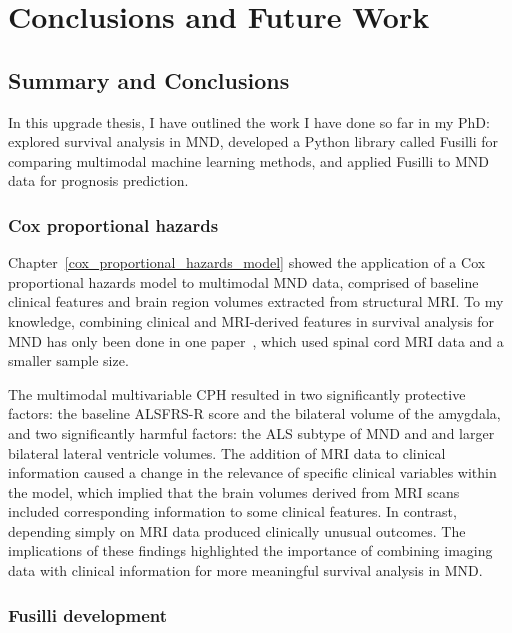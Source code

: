 \chapter{Conclusions and Future Work}
\label{conclusions_and_future_work}

\section{Summary and Conclusions}

In this upgrade thesis, I have outlined the work I have done so far in my PhD: explored survival analysis in MND, developed a Python library called Fusilli for comparing multimodal machine learning methods, and applied Fusilli to MND data for prognosis prediction.

\subsection{Cox proportional hazards}

Chapter~\ref{cox_proportional_hazards_model} showed the application of a Cox proportional hazards model to multimodal MND data, comprised of baseline clinical features and brain region volumes extracted from structural MRI.
To my knowledge, combining clinical and MRI-derived features in survival analysis for MND has only been done in one paper~\cite{querinSpinalCordMultiparametric2017}, which used spinal cord MRI data and a smaller sample size.

The multimodal multivariable CPH resulted in two significantly protective factors: the baseline ALSFRS-R score and the bilateral volume of the amygdala, and two significantly harmful factors: the ALS subtype of MND and and larger bilateral lateral ventricle volumes.
The addition of MRI data to clinical information caused a change in the relevance of specific clinical variables within the model, which implied that the brain volumes derived from MRI scans included corresponding information to some clinical features.
In contrast, depending simply on MRI data produced clinically unusual outcomes.
The implications of these findings highlighted the importance of combining imaging data with clinical information for more meaningful survival analysis in MND.

\subsection{Fusilli development}

